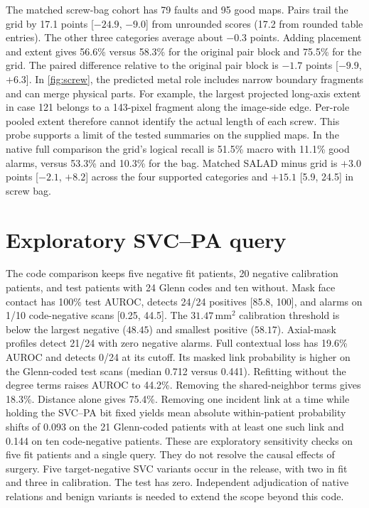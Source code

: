 \documentclass[10pt,twocolumn,letterpaper]{article}
\begin{document}
The matched screw-bag cohort has 79 faults and 95 good maps. Pairs trail the grid by 17.1 points [$-24.9$, $-9.0$] from unrounded scores (17.2 from rounded table entries). The other three categories average about $-0.3$ points. Adding placement and extent gives 56.6\% versus 58.3\% for the original pair block and 75.5\% for the grid. The paired difference relative to the original pair block is $-1.7$ points [$-9.9$, $+6.3$]. In \cref{fig:screw}, the predicted metal role includes narrow boundary fragments and can merge physical parts. For example, the largest projected long-axis extent in case 121 belongs to a 143-pixel fragment along the image-side edge. Per-role pooled extent therefore cannot identify the actual length of each screw. This probe supports a limit of the tested summaries on the supplied maps. In the native full comparison the grid's logical recall is 51.5\% macro with 11.1\% good alarms, versus 53.3\% and 10.3\% for the bag. Matched SALAD minus grid is $+3.0$ points [$-2.1$, $+8.2$] across the four supported categories and $+15.1$ [5.9, 24.5] in screw bag.

\section{Exploratory SVC--PA query}
The code comparison keeps five negative fit patients, 20 negative calibration patients, and test patients with 24 Glenn codes and ten without. Mask face contact has 100\% test AUROC, detects 24/24 positives [85.8, 100], and alarms on 1/10 code-negative scans [0.25, 44.5]. The $31.47\,\mathrm{mm}^2$ calibration threshold is below the largest negative ($48.45$) and smallest positive ($58.17$). Axial-mask profiles detect 21/24 with zero negative alarms. Full contextual loss has 19.6\% AUROC and detects 0/24 at its cutoff. Its masked link probability is higher on the Glenn-coded test scans (median 0.712 versus 0.441). Refitting without the degree terms raises AUROC to 44.2\%. Removing the shared-neighbor terms gives 18.3\%. Distance alone gives 75.4\%. Removing one incident link at a time while holding the SVC--PA bit fixed yields mean absolute within-patient probability shifts of 0.093 on the 21 Glenn-coded patients with at least one such link and 0.144 on ten code-negative patients. These are exploratory sensitivity checks on five fit patients and a single query. They do not resolve the causal effects of surgery. Five target-negative SVC variants occur in the release, with two in fit and three in calibration. The test has zero. Independent adjudication of native relations and benign variants is needed to extend the scope beyond this code.
\end{document}
